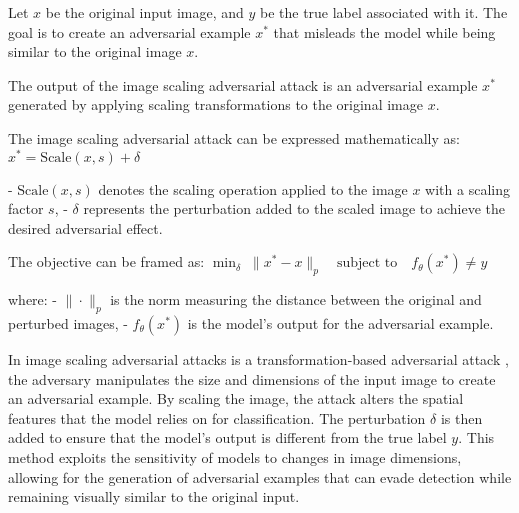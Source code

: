 Let $x$ be the original input image, and $y$ be the true label associated with it. The goal is to create an adversarial example $x^*$ that misleads the model while being similar to the original image $x$.

The output of the image scaling adversarial attack is an adversarial example $x^*$ generated by applying scaling transformations to the original image $x$.

The image scaling adversarial attack can be expressed mathematically as:
$x^* = \text{Scale}(x, s) + \delta$

- $\text{Scale}(x, s)$ denotes the scaling operation applied to the image $x$ with a scaling factor $s$,
- $\delta$ represents the perturbation added to the scaled image to achieve the desired adversarial effect.

The objective can be framed as:
$\min_{\delta} \; \|x^* - x\|_p \quad \text{subject to} \quad f_\theta(x^*) \neq y$

where:
- $\|\cdot\|_p$ is the norm measuring the distance between the original and perturbed images,
- $f_\theta(x^*)$ is the model's output for the adversarial example.

In image scaling adversarial attacks is a  transformation-based adversarial attack , the adversary manipulates the size and dimensions of the input image to create an adversarial example. By scaling the image, the attack alters the spatial features that the model relies on for classification. The perturbation $\delta$ is then added to ensure that the model's output is different from the true label $y$. This method exploits the sensitivity of models to changes in image dimensions, allowing for the generation of adversarial examples that can evade detection while remaining visually similar to the original input.
